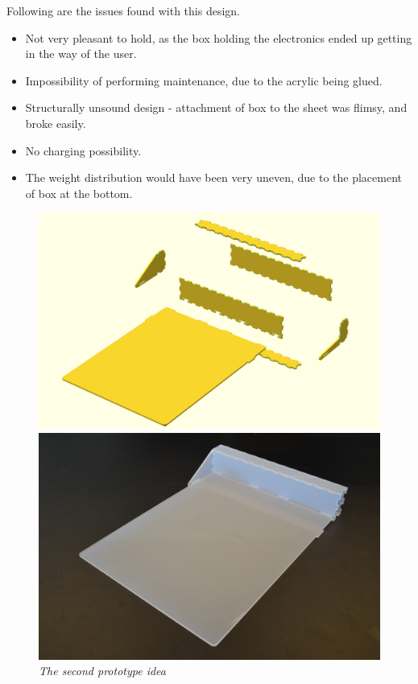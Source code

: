 Following are the issues found with this design.

\begin{itemize} \itemsep0em
	\item Not very pleasant to hold, as the box holding the electronics ended up getting in the way of the user.
	\item Impossibility of performing maintenance, due to the acrylic being glued.
	\item Structurally unsound design - attachment of box to the sheet was flimsy, and broke easily.
	\item No charging possibility.
	\item The weight distribution would have been very uneven, due to the placement of box at the bottom.
\end{itemize}

\begin{figure}[h]
\begin{minipage}[b]{7.5cm}
\centering
\includegraphics[scale=0.235]{figures/iterations/v3.png}
\end{minipage}
\begin{minipage}[b]{7.5cm}
\centering
\includegraphics[scale=0.58]{figures/iterations/v3-photo.jpg}
\end{minipage}
\caption{\small {\it {The second prototype idea}}} \label{fig:v2}
\end{figure}

